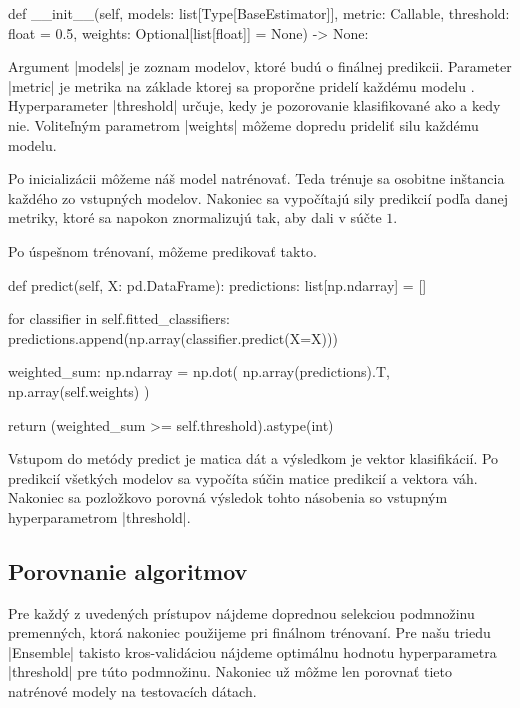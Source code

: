 \documentclass[report.tex]{subfiles}
\begin{document}
\begin{python}
    def __init__(self, models: list[Type[BaseEstimator]],
             metric: Callable, threshold: float = 0.5,
             weights: Optional[list[float]] = None) -> None:
\end{python}
Argument \pyth|models| je zoznam modelov, ktoré budú  o finálnej predikcii. Parameter \pyth|metric| je metrika na základe ktorej sa  proporčne pridelí každému modelu . Hyperparameter \pyth|threshold| určuje, kedy je pozorovanie klasifikované ako  a kedy nie. Voliteľným parametrom \pyth|weights| môžeme dopredu prideliť silu každému modelu.

Po inicializácii môžeme náš  model natrénovať. Teda trénuje sa osobitne inštancia každého zo vstupných modelov. Nakoniec sa vypočítajú sily predikcií podľa danej metriky, ktoré sa napokon znormalizujú tak, aby dali v súčte $1$. 

Po úspešnom trénovaní, môžeme predikovať takto.
\begin{python}
    def predict(self, X: pd.DataFrame):
    predictions: list[np.ndarray] = []

    for classifier in self.fitted_classifiers:
        predictions.append(np.array(classifier.predict(X=X)))
    
    weighted_sum: np.ndarray = np.dot(
    	np.array(predictions).T, np.array(self.weights)
    	)

    return (weighted_sum >= self.threshold).astype(int)
\end{python}
Vstupom do metódy predict je matica dát a výsledkom je vektor klasifikácií. Po predikcií všetkých modelov sa vypočíta súčin matice predikcií a vektora váh. Nakoniec sa pozložkovo porovná výsledok tohto násobenia so vstupným hyperparametrom \pyth|threshold|.

\subsection{Porovnanie algoritmov}

Pre každý z uvedených prístupov nájdeme doprednou selekciou podmnožinu premenných, ktorá nakoniec použijeme pri finálnom trénovaní. Pre našu triedu \pyth|Ensemble| takisto kros-validáciou nájdeme optimálnu hodnotu hyperparametra \pyth|threshold| pre túto podmnožinu. Nakoniec už môžme len porovnať tieto natrénové modely na testovacích dátach.
\end{document}
